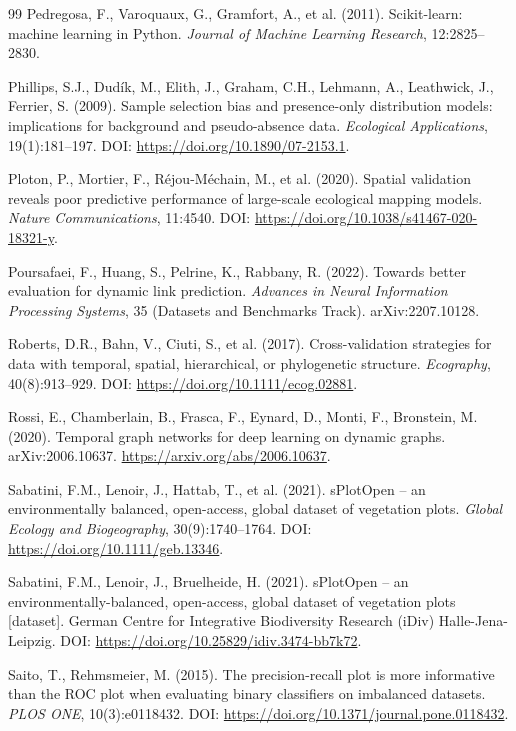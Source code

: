 \documentclass[a4paper,fleqn]{cas-sc}
\begin{document}
\begin{thebibliography}{99}
 Pedregosa, F., Varoquaux, G., Gramfort, A., et al. (2011). Scikit-learn: machine learning in Python. \textit{Journal of Machine Learning Research}, 12:2825--2830.

 Phillips, S.J., Dud\'ik, M., Elith, J., Graham, C.H., Lehmann, A., Leathwick, J., Ferrier, S. (2009). Sample selection bias and presence-only distribution models: implications for background and pseudo-absence data. \textit{Ecological Applications}, 19(1):181--197. DOI: \url{https://doi.org/10.1890/07-2153.1}.

 Ploton, P., Mortier, F., R\'ejou-M\'echain, M., et al. (2020). Spatial validation reveals poor predictive performance of large-scale ecological mapping models. \textit{Nature Communications}, 11:4540. DOI: \url{https://doi.org/10.1038/s41467-020-18321-y}.

 Poursafaei, F., Huang, S., Pelrine, K., Rabbany, R. (2022). Towards better evaluation for dynamic link prediction. \textit{Advances in Neural Information Processing Systems}, 35 (Datasets and Benchmarks Track). arXiv:2207.10128.

 Roberts, D.R., Bahn, V., Ciuti, S., et al. (2017). Cross-validation strategies for data with temporal, spatial, hierarchical, or phylogenetic structure. \textit{Ecography}, 40(8):913--929. DOI: \url{https://doi.org/10.1111/ecog.02881}.

 Rossi, E., Chamberlain, B., Frasca, F., Eynard, D., Monti, F., Bronstein, M. (2020). Temporal graph networks for deep learning on dynamic graphs. arXiv:2006.10637. \url{https://arxiv.org/abs/2006.10637}.

 Sabatini, F.M., Lenoir, J., Hattab, T., et al. (2021). sPlotOpen -- an environmentally balanced, open-access, global dataset of vegetation plots. \textit{Global Ecology and Biogeography}, 30(9):1740--1764. DOI: \url{https://doi.org/10.1111/geb.13346}.

 Sabatini, F.M., Lenoir, J., Bruelheide, H. (2021). sPlotOpen -- an environmentally-balanced, open-access, global dataset of vegetation plots [dataset]. German Centre for Integrative Biodiversity Research (iDiv) Halle-Jena-Leipzig. DOI: \url{https://doi.org/10.25829/idiv.3474-bb7k72}.

 Saito, T., Rehmsmeier, M. (2015). The precision-recall plot is more informative than the ROC plot when evaluating binary classifiers on imbalanced datasets. \textit{PLOS ONE}, 10(3):e0118432. DOI: \url{https://doi.org/10.1371/journal.pone.0118432}.


\end{thebibliography}
\end{document}
